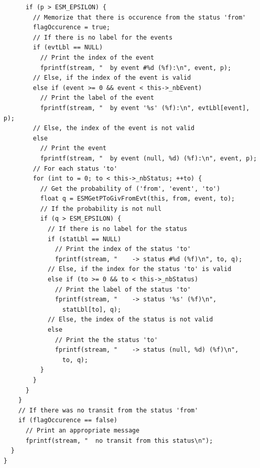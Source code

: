 \documentclass[12pt, a4paper]{article}
\begin{document}
\begin{scriptsize}
\begin{ttfamily}
\begin{lstlisting}
      if (p > ESM_EPSILON) {
        // Memorize that there is occurence from the status 'from'
        flagOccurence = true;
        // If there is no label for the events
        if (evtLbl == NULL)
          // Print the index of the event
          fprintf(stream, "  by event #%d (%f):\n", event, p);
        // Else, if the index of the event is valid
        else if (event >= 0 && event < this->_nbEvent)
          // Print the label of the event
          fprintf(stream, "  by event '%s' (%f):\n", evtLbl[event], p);
        // Else, the index of the event is not valid
        else
          // Print the event
          fprintf(stream, "  by event (null, %d) (%f):\n", event, p);
        // For each status 'to'
        for (int to = 0; to < this->_nbStatus; ++to) {
          // Get the probability of ('from', 'event', 'to')
          float q = ESMGetPToGivFromEvt(this, from, event, to);
          // If the probability is not null
          if (q > ESM_EPSILON) {
            // If there is no label for the status
            if (statLbl == NULL)
              // Print the index of the status 'to'
              fprintf(stream, "    -> status #%d (%f)\n", to, q);
            // Else, if the index for the status 'to' is valid
            else if (to >= 0 && to < this->_nbStatus)
              // Print the label of the status 'to'
              fprintf(stream, "    -> status '%s' (%f)\n", 
                statLbl[to], q);
            // Else, the index of the status is not valid
            else
              // Print the the status 'to'
              fprintf(stream, "    -> status (null, %d) (%f)\n", 
                to, q);
          }
        }
      }
    }
    // If there was no transit from the status 'from'
    if (flagOccurence == false)
      // Print an appropriate message
      fprintf(stream, "  no transit from this status\n");
  }
}


\end{lstlisting}
\end{ttfamily}
\end{scriptsize}
\end{document}
